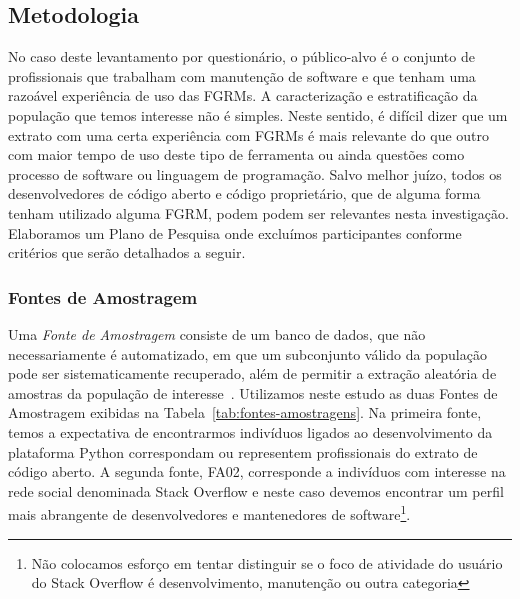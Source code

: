 \subsection{Metodologia}
\label{subsec:pesq_metodologias}

No caso deste levantamento por questionário, o público-alvo é o conjunto de
profissionais que trabalham com manutenção de software e que tenham uma razoável
experiência de uso das FGRMs. A caracterização e estratificação da população que
temos interesse não é simples. Neste sentido, é difícil dizer que um extrato com
uma certa experiência com FGRMs é mais relevante do que outro com maior tempo de
uso deste tipo de ferramenta ou ainda questões como processo de software ou
linguagem de programação. Salvo melhor juízo, todos os desenvolvedores de código
aberto e código proprietário, que de alguma forma tenham utilizado alguma FGRM,
podem podem ser relevantes nesta investigação. Elaboramos um Plano de Pesquisa
onde excluímos participantes conforme critérios que serão detalhados a seguir.

\subsubsection{Fontes de Amostragem}
\label{subsubsec:fontes_amostragem}

Uma \textit{Fonte de Amostragem} consiste de um banco de dados, que não
necessariamente é automatizado, em que um subconjunto válido da população pode
ser sistematicamente recuperado, além de permitir a extração aleatória de
amostras da população de interesse~\cite{de2014towards}. Utilizamos neste estudo
as duas Fontes de Amostragem exibidas na Tabela~\ref{tab:fontes-amostragens}.
Na primeira fonte, temos a expectativa de encontrarmos indivíduos ligados ao
desenvolvimento da plataforma Python correspondam ou representem profissionais
do extrato de código aberto. A segunda fonte, FA02, corresponde a indivíduos com
interesse na rede social denominada Stack Overflow e neste caso devemos
encontrar um perfil mais abrangente de desenvolvedores e mantenedores de
software\footnote{Não colocamos esforço em tentar distinguir se o foco de
	atividade do usuário do Stack Overflow é desenvolvimento, manutenção ou
	outra categoria}.

\begin{table}[htpb]
\centering
{}
\caption{Fontes de Amostragem utilizadas no levantamento com questionário.}
\label{tab:fontes-amostragens}
\end{table}

